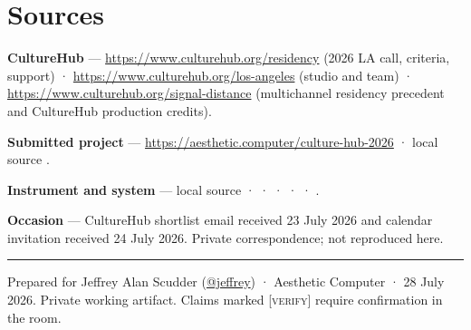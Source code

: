 \documentclass[11pt,letterpaper]{article}
\newcommand{\soft}[1]{{\color{acwarn}\footnotesize\textsc{[#1]}}}
\begin{document}
\section{Sources}

\footnotesize
\textbf{CultureHub} ---
\url{https://www.culturehub.org/residency} (2026 LA call, criteria, support) ·
\url{https://www.culturehub.org/los-angeles} (studio and team) ·
\url{https://www.culturehub.org/signal-distance} (multichannel residency
precedent and CultureHub production credits).

\textbf{Submitted project} ---
\url{https://aesthetic.computer/culture-hub-2026} · local source
.

\textbf{Instrument and system} --- local source
 ·
 ·
 ·
 ·
 ·
.

\textbf{Occasion} --- CultureHub shortlist email received 23 July 2026 and
calendar invitation received 24 July 2026. Private correspondence; not
reproduced here.

\normalsize
\vspace{0.9em}
\noindent\rule{\textwidth}{0.5pt}\par
\vspace{0.45em}
{\footnotesize\color{acgray}
Prepared for Jeffrey Alan Scudder (\href{https://prompt.ac/@jeffrey}{@jeffrey}) ·
Aesthetic Computer · 28 July 2026. Private working artifact. Claims marked
\soft{verify} require confirmation in the room.}
\end{document}
